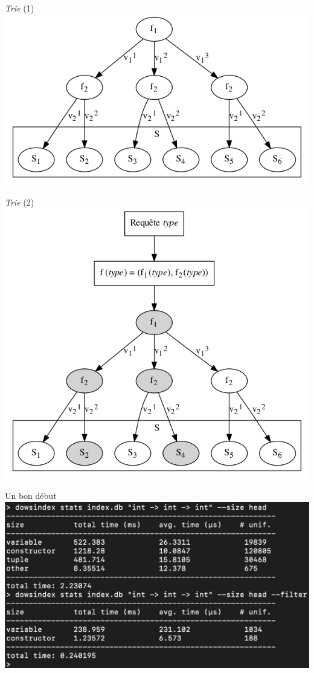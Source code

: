 \documentclass[serif]{beamer}
\newcommand{\?}{\stackrel{?}{=}}
\begin{document}
\begin{frame}{\textit {Trie} (1)}
  \includegraphics[scale=0.5,center]{graphs/trie1}
\end{frame}


\begin{frame}{\textit {Trie} (2)}
  \includegraphics[scale=0.4,center]{graphs/trie2}
\end{frame}


\begin{frame}{Un bon début}
  \includegraphics[scale=0.3,center]{images/stats4}
\end{frame}
\end{document}
